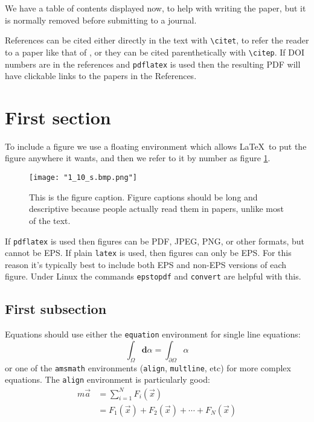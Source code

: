 \documentclass[11pt]{article}
\begin{document}
We have a table of contents displayed now, to help with writing the
paper, but it is normally removed before submitting to a journal.

References can be cited either directly in the text with
\verb+\citet+, to refer the reader to a paper like that of
\citet{Giles2003}, or they can be cited parenthetically
\citep{Adams2002} with \verb+\citep+. If DOI numbers are in the
references and \verb+pdflatex+ is used then the resulting PDF will
have clickable links to the papers in the References.

\section{First section}

To include a figure we use a floating environment which allows
\LaTeX\ to put the figure anywhere it wants, and then we refer to it
by number as figure \ref{fig:sample}.

\begin{figure}
\begin{center}
\texttt{[image: "1\_10\_s.bmp.png"]}
\end{center}
\caption{\label{fig:sample} This is the figure caption. Figure
  captions should be long and descriptive because people actually read
  them in papers, unlike most of the text.}
\end{figure}

If \verb+pdflatex+ is used then figures can be PDF, JPEG, PNG, or
other formats, but cannot be EPS. If plain \verb+latex+ is used, then
figures can only be EPS. For this reason it's typically best to
include both EPS and non-EPS versions of each figure. Under Linux the
commands \verb+epstopdf+ and \verb+convert+ are helpful with this.


\subsection{First subsection}

Equations should use either the \verb+equation+ environment for single
line equations:
\begin{equation}
\label{eqn:stokes_thm}
\int_{\Omega} \mathbf{d}\alpha = \int_{\partial \Omega} \alpha
\end{equation}
or one of the \verb+amsmath+ environments (\verb+align+,
\verb+multline+, etc) for more complex equations. The \verb+align+
environment is particularly good:
\begin{align}
\label{eqn:newton}
m\vec{a} &= \sum_{i = 1}^N F_i(\vec{x}) \\
\label{eqn:newton_expanded}
&= F_1(\vec{x}) + F_2(\vec{x}) + \cdots + F_N(\vec{x})
\end{align}
\end{document}
